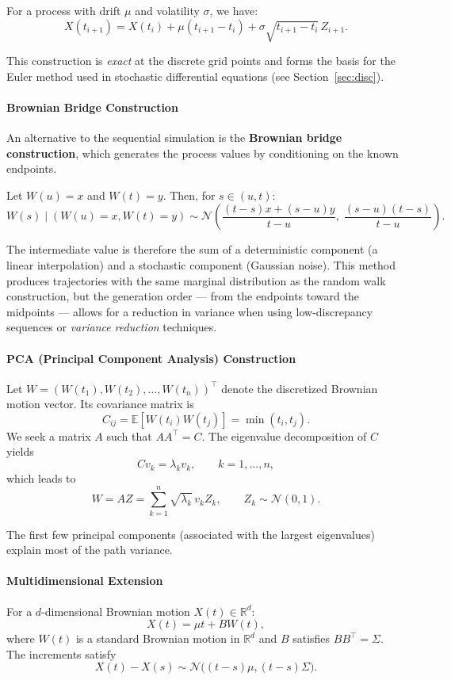 For a process with drift $\mu$ and volatility $\sigma$, we have:
\[
X(t_{i+1}) = X(t_i) + \mu (t_{i+1}-t_i) + \sigma \sqrt{t_{i+1}-t_i}\,Z_{i+1}.
\]

This construction is \emph{exact} at the discrete grid points and forms the basis for the Euler method used in stochastic differential equations (see Section~\ref{sec:disc}).
\paragraph{Brownian Bridge Construction}

An alternative to the sequential simulation is the \textbf{Brownian bridge construction}, which generates the process values by conditioning on the known endpoints.

Let $W(u)=x$ and $W(t)=y$. Then, for $s \in (u,t)$:
\[
W(s) \mid (W(u)=x, W(t)=y) \sim 
\mathcal{N}\!\left(
\frac{(t-s)x + (s-u)y}{t-u},\;
\frac{(s-u)(t-s)}{t-u}
\right).
\]

The intermediate value is therefore the sum of a deterministic component (a linear interpolation) and a stochastic component (Gaussian noise).  
This method produces trajectories with the same marginal distribution as the random walk construction, but the generation order — from the endpoints toward the midpoints — allows for a reduction in variance when using low-discrepancy sequences or \emph{variance reduction} techniques.
\paragraph{PCA (Principal Component Analysis) Construction}

Let $W = (W(t_1), W(t_2), \dots, W(t_n))^\top$ denote the discretized Brownian motion vector. Its covariance matrix is
\[
C_{ij} = \mathbb{E}[W(t_i) W(t_j)] = \min(t_i, t_j).
\]
We seek a matrix $A$ such that $A A^\top = C$.  
The eigenvalue decomposition of $C$ yields
\[
C v_k = \lambda_k v_k, \qquad k = 1, \dots, n,
\]
which leads to
\[
W = A Z = \sum_{k=1}^n \sqrt{\lambda_k}\, v_k Z_k, \qquad Z_k \sim \mathcal{N}(0,1).
\]

The first few principal components (associated with the largest eigenvalues) explain most of the path variance.  
\paragraph{Multidimensional Extension}

For a $d$-dimensional Brownian motion $X(t) \in \mathbb{R}^d$:
\[
X(t) = \mu t + B W(t),
\]
where $W(t)$ is a standard Brownian motion in $\mathbb{R}^d$ and $B$ satisfies $B B^\top = \Sigma$.  
The increments satisfy
\[
X(t) - X(s) \sim \mathcal{N}\!\big((t-s)\mu, (t-s)\Sigma\big).
\]


